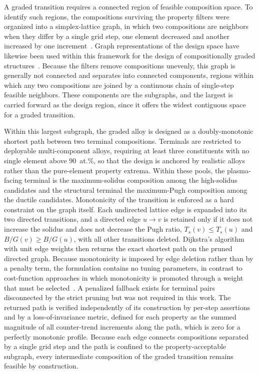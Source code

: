 A graded transition requires a connected region of feasible composition
space. To identify such regions, the compositions surviving the property
filters were organized into a simplex-lattice graph, in which two
compositions are neighbors when they differ by a single grid step, one
element decreased and another increased by one increment~\cite{nimplex}.
Graph representations of the design space have likewise been used within
this framework for the design of compositionally graded
structures~\cite{multiterminalCGA2024}. Because the filters remove
compositions unevenly, this graph is generally not connected and separates
into connected components, regions within which any
two compositions are joined by a continuous chain of single-step feasible
neighbors. These components are the subgraphs, and the largest is carried
forward as the design region, since it offers the widest contiguous space
for a graded transition.

Within this largest subgraph, the graded alloy is designed as a
doubly-monotonic shortest path between two terminal compositions. Terminals
are restricted to deployable multi-component alloys, requiring at least
three constituents with no single element above \(90\)~at.\%, so that the
design is anchored by realistic alloys rather than the pure-element property
extrema. Within these pools, the plasma-facing terminal is the
maximum-solidus composition among the high-solidus candidates and the
structural terminal the maximum-Pugh composition among the ductile
candidates. Monotonicity of the transition is enforced as a hard constraint
on the graph itself. Each undirected lattice edge is expanded into its two directed
transitions, and a directed edge \(u\!\to\!v\) is retained only if it does
not increase the solidus and does not decrease the Pugh ratio,
\(T_s(v)\le T_s(u)\) and \(B/G(v)\ge B/G(u)\), with all other transitions
deleted. Dijkstra's algorithm with unit edge weights then returns the exact
shortest path on the pruned directed graph. Because monotonicity is imposed
by edge deletion rather than by a penalty term, the formulation contains no
tuning parameters, in contrast to cost-function approaches in which
monotonicity is promoted through a weight that must be
selected~\cite{kirk2021monotonic}. A penalized fallback exists for terminal
pairs disconnected by the strict pruning but was not required in this work.
The returned path is verified independently of its construction by per-step
assertions and by a loss-of-invariance metric, defined for each property as
the summed magnitude of all counter-trend increments along the path, which
is zero for a perfectly monotonic profile. Because each edge connects
compositions separated by a single grid step and the path is confined to the
property-acceptable subgraph, every intermediate composition of the graded
transition remains feasible by construction.



